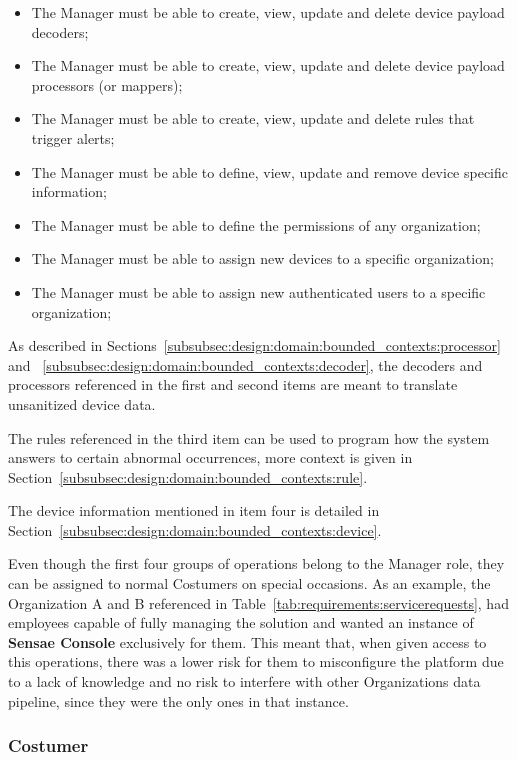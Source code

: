 \begin{itemize}
    \item The Manager must be able to create, view, update and delete device payload decoders;
    \item The Manager must be able to create, view, update and delete device payload processors (or mappers);
    \item The Manager must be able to create, view, update and delete rules that trigger alerts;
    \item The Manager must be able to define, view, update and remove device specific information;
    \item The Manager must be able to define the permissions of any organization;
    \item The Manager must be able to assign new devices to a specific organization;
    \item The Manager must be able to assign new authenticated users to a specific organization;
\end{itemize}

As described in Sections~\ref{subsubsec:design:domain:bounded_contexts:processor} and ~\ref{subsubsec:design:domain:bounded_contexts:decoder}, the decoders and processors referenced in the first and second items are meant to translate unsanitized device data.

The rules referenced in the third item can be used to program how the system answers to certain abnormal occurrences, more context is given in Section~\ref{subsubsec:design:domain:bounded_contexts:rule}.

The device information mentioned in item four is detailed in Section~\ref{subsubsec:design:domain:bounded_contexts:device}.

Even though the first four groups of operations belong to the Manager role, they can be assigned to normal Costumers on special occasions. As an example, the Organization A and B referenced in Table~\ref{tab:requirements:servicerequests}, had employees capable of fully managing the solution and wanted an instance of \textbf{Sensae Console} exclusively for them. This meant that, when given access to this operations, there was a lower risk for them to misconfigure the platform due to a lack of knowledge and no risk to interfere with other Organizations data pipeline, since they were the only ones in that instance.

\subsubsection{Costumer}
\label{subsubsec:requirements:functional:sensae:costumer}

